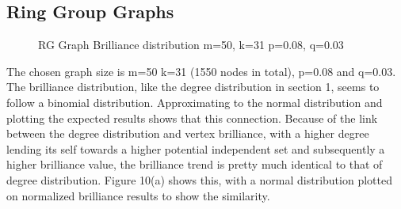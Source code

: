 \documentclass[12pt,a4paper]{article}
\begin{document}
\subsection{Ring Group Graphs}
\begin{figure}[h]
	\centering
	\qquad
	\caption{RG Graph Brilliance distribution m=50, k=31 p=0.08, q=0.03}
	\label{both}
\end{figure}

The chosen graph size is m=50 k=31 (1550 nodes in total), p=0.08 and q=0.03. The brilliance distribution, like the degree distribution in section 1, seems to follow a binomial distribution. Approximating to the normal distribution and plotting the expected results shows that this connection. Because of the link between the degree distribution and vertex brilliance, with a higher degree lending its self towards a higher potential independent set and subsequently a higher brilliance value, the brilliance trend is pretty much identical to that of degree distribution. Figure 10(a) shows this, with a normal distribution plotted on normalized brilliance results to show the similarity.
\end{document}
